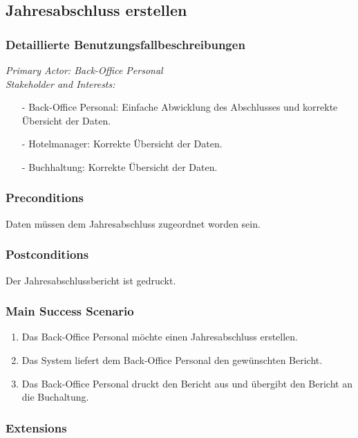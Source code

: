 \documentclass[./detailed_overview_usecases.tex]{subfiles}
\begin{document}
    \subsection{Jahresabschluss erstellen}
    \subsubsection{Detaillierte Benutzungsfallbeschreibungen}
    \textit{Primary Actor: Back-Office Personal}
    \\
    \textit{Stakeholder and Interests:}
    \begin{itemize}
        \item[-] Back-Office Personal: Einfache Abwicklung des Abschlusses und korrekte Übersicht der Daten.
        \item[-] Hotelmanager: Korrekte Übersicht der Daten.
        \item[-] Buchhaltung: Korrekte Übersicht der Daten.
    \end{itemize}

    \subsubsection*{Preconditions}
    Daten müssen dem Jahresabschluss zugeordnet worden sein.
    \subsubsection*{Postconditions}
    Der Jahresabschlussbericht ist gedruckt.

    \subsubsection*{Main Success Scenario}
    \begin{enumerate}
        \item Das Back-Office Personal möchte einen Jahresabschluss erstellen.
        \item Das System liefert dem Back-Office Personal den gewünschten Bericht.
        \item Das Back-Office Personal druckt den Bericht aus und übergibt den Bericht an die Buchaltung.
    \end{enumerate}

    \subsubsection*{Extensions}
\end{document}
